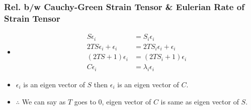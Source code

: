 \documentclass[../presentation.tex]{subfiles}
\begin{document}
\begin{frame}
  \frametitle{\small Rel. b/w Cauchy-Green Strain Tensor \& Eulerian Rate of Strain Tensor}

  \begin{itemize}
    \item \begin{equation}
      \begin{aligned}
        S\epsilon_i &= S_i\epsilon_i \\
        2TS\epsilon_i + \epsilon_i &= 2TS_i\epsilon_i + \epsilon_i \\
        (2TS + 1)\epsilon_i &= (2TS_i + 1)\epsilon_i \\
        C\epsilon_i &= \lambda_i\epsilon_i
      \end{aligned}
    \end{equation}
    
    \item \(\epsilon_i\) is an eigen vector of \(S\) then \(\epsilon_i\) is an eigen vector of \(C\).
    
    \item \(\therefore\) We can say as \(T\) goes to 0, eigen vector of \(C\) is same as eigen vector of \(S\).
  \end{itemize}
\end{frame}
\end{document}
